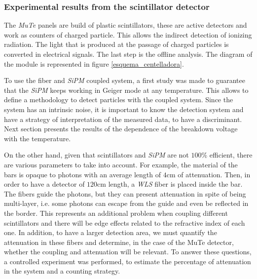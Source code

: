 \documentclass[submitting]{nst}
\begin{document}
\subsubsection{Experimental results from the scintillator detector}\label{sec:bar-data}%
The \textsl{MuTe} panels are build of plastic scintillators, these are active detectors  and  work as counters of charged particle. This allows the indirect detection of ionizing radiation. The light that is produced at the passage of charged particles is converted in electrical signals. The last step is the offline analysis. The diagram of the module is represented in figure \ref{esquema_centelladora}. 

To use the fiber and \textsl{SiPM} coupled system, a first study was made to guarantee that the \textsl{SiPM} keeps working in Geiger mode at any temperature. This allows to define a methodology to detect particles with the coupled system. %
Since the system has an intrinsic noise, it is important to know the detection system and have a strategy of interpretation of the measured data, to have a discriminant. Next section presents the results of the dependence of the breakdown voltage with the temperature.

On the other hand, given that scintillators and \textsl{SiPM} are not $100$\% efficient, there are various parameters to take into account. For example, the material of the bars is opaque to photons with an average length of $4$cm of attenuation. Then, in order to have a detector of $120$cm length, a \textsl{WLS} fiber is placed inside the bar. The fibers guide the photons, but they can present attenuation in spite of being multi-layer, i.e. some photons can escape from the guide and even be reflected in the border. This represents an additional problem when coupling different scintillators and there will be edge effects related to the refractive index of each one.
In addition, to have a larger detection area, we must quantify the attenuation in these fibers and determine, in the case of the MuTe detector, whether the coupling and attenuation will be relevant. To answer these questions, a controlled experiment was performed, to estimate the percentage of attenuation in the system and a counting strategy.

\end{document}
